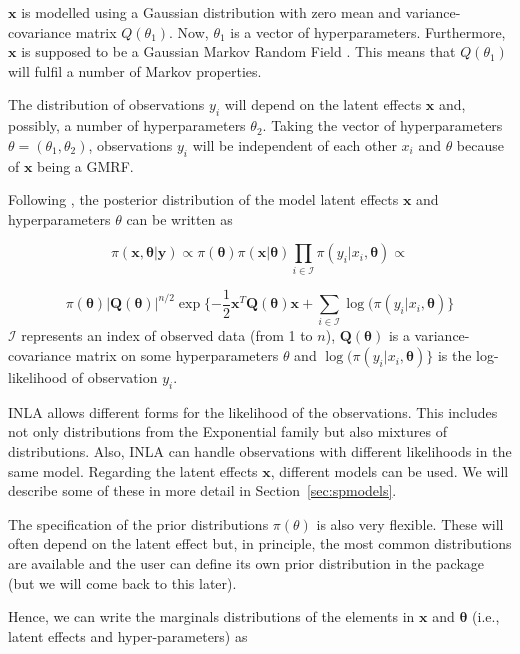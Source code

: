 \documentclass[article]{jss}
\begin{document}
$\mathbf{x}$ is modelled using a Gaussian distribution with zero mean and
variance-covariance matrix $Q(\theta_1)$. Now, $\theta_1$ is a vector of
hyperparameters. Furthermore, $\mathbf{x}$ is supposed to be a Gaussian Markov
Random Field \citep[GMRF,][]{rueheld:2005}. This means that  $Q(\theta_1)$ will fulfil a number of
Markov properties. 

The distribution of observations $y_i$ will depend on the latent effects
$\mathbf{x}$ and, possibly, a number of hyperparameters $\theta_2$.  Taking
the vector of hyperparameters $\theta=(\theta_1, \theta_2)$, observations
$y_i$ will be independent of each other $x_i$ and $\theta$ because
of $\mathbf{x}$ being a GMRF.

Following \citet{isi:000264374200002}, the posterior distribution of the model
latent effects $\mathbf{x}$ and hyperparameters $\theta$ can be written as 

$$
\pi(\mathbf{x}, \mathbf{\theta}|\mathbf{y}) \propto
\pi(\mathbf{\theta}) \pi(\mathbf{x}|\mathbf{\theta})\prod_{i\in \mathcal{I}}\pi(y_i|x_i,\mathbf{\theta})
\propto 
$$

$$
\pi(\mathbf{\theta}) |\mathbf{Q}(\mathbf{\theta})|^{n/2} \exp\{-\frac{1}{2}\mathbf{x}^T \mathbf{Q}(\mathbf{\theta}) \mathbf{x}+\sum_{i\in\mathcal{I}} \log(\pi(y_i|x_i, \mathbf{\theta}) \}
$$
\noindent
$\mathcal{I}$ represents an index of observed data (from 1 to $n$),
$\mathbf{Q}(\mathbf{\theta})$ is a variance-covariance matrix on some
hyperparameters $\theta$ and $\log(\pi(y_i|x_i, \mathbf{\theta}) \}$ is
the log-likelihood of observation $y_i$.

INLA allows different forms for the likelihood of the observations.  This
includes not only distributions from the Exponential family but also mixtures
of distributions. Also, INLA can handle observations with different likelihoods
in the same model. Regarding the latent effects $\mathbf{x}$, different models
can be used. We will describe some of these in more detail in
Section~\ref{sec:spmodels}.


The specification of the prior distributions $\pi(\theta)$ is also very 
flexible. These will often depend on the latent effect but, in principle,
the most common distributions are available and the user can define its
own prior distribution in the  package (but we will come
back to this later). 

Hence, we can write the marginals distributions of the elements in $\mathbf{x}$
and $\mathbf{\theta}$ (i.e., latent effects and hyper-parameters) as
\end{document}
